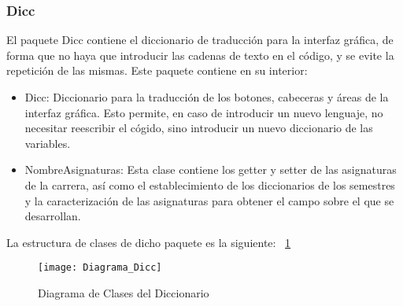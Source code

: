 \subsubsection{Dicc}
El paquete Dicc contiene el diccionario de traducción para la interfaz gráfica, de forma que no haya que introducir las cadenas de texto en el código, y se evite la repetición de las mismas. Este paquete contiene en su interior: 
\begin{itemize}
\item Dicc: Diccionario para la traducción de los botones, cabeceras y áreas de la interfaz gráfica. Esto permite, en caso de introducir un nuevo lenguaje, no necesitar reescribir el cógido, sino introducir un nuevo diccionario de las variables. 
\item NombreAsignaturas: Esta clase contiene los getter y setter de las asignaturas de la carrera, así como el establecimiento de los diccionarios de los semestres y la caracterización de las asignaturas para obtener el campo sobre el que se desarrollan. 
\end{itemize}
La estructura de clases de dicho paquete es la siguiente: ~\ref{fig:C.4.2}
\begin{figure}[h]
\centering
\texttt{[image: Diagrama\_Dicc]}
\caption{Diagrama de Clases del Diccionario}
\label{fig:C.4.2}
\end{figure}
